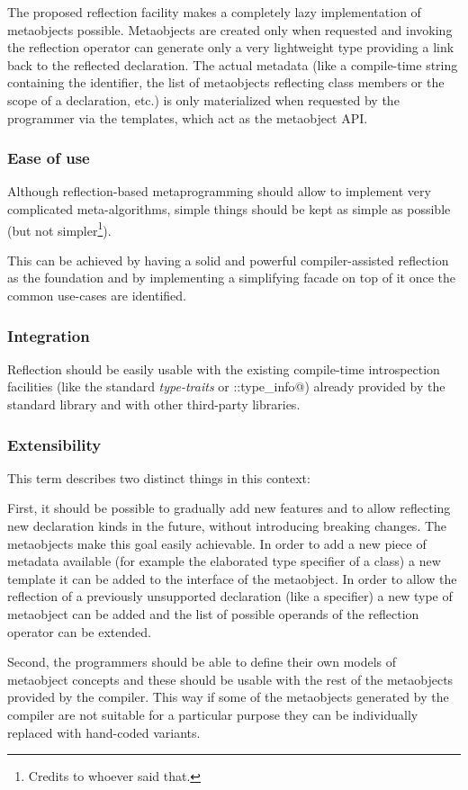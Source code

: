 The proposed reflection facility makes a completely lazy implementation of
metaobjects possible. Metaobjects are created only when requested and invoking
the reflection operator can generate only a very
lightweight type providing a link back to the reflected declaration. The actual
metadata (like a compile-time string containing the identifier,
the list of metaobjects reflecting class members or the scope of a declaration, etc.)
is only materialized when requested by the programmer via the
templates, which act as the metaobject API.

\subsubsection{Ease of use}
\label{design-ease-of-use}

Although reflection-based metaprogramming should allow to implement very
complicated meta-algorithms, simple things should be kept as simple as possible
(but not simpler\footnote{Credits to whoever said that.}).

This can be achieved by having a solid and powerful compiler-assisted reflection
as the foundation and by implementing a simplifying facade on top of it once
the common use-cases are identified.

\subsubsection{Integration}
\label{design-integration}

Reflection should be easily
usable with the existing compile-time introspection facilities (like the standard
{\em type-traits} or \verb@std::type_info@)
already provided by the standard library and with other third-party libraries.

\subsubsection{Extensibility}
\label{design-extensibility}

This term describes two distinct things in this context:

First, it should be possible to gradually add new features and to allow
reflecting new declaration kinds
in the future, without introducing breaking changes. The metaobjects make this
goal easily achievable. In order to add a new piece of metadata available
(for example the elaborated type specifier of a class) a new template 
it can be added to the interface of the metaobject. In order to allow the reflection
of a previously unsupported declaration (like a specifier) a new type of metaobject
can be added and the list of possible operands of the reflection operator
can be extended.

Second, the programmers should be able to define their own models of metaobject concepts
and these should be usable with the rest of the metaobjects provided by the
compiler. This way if some of the metaobjects generated by the compiler are not
suitable for a particular purpose they can be individually replaced with
hand-coded variants.


